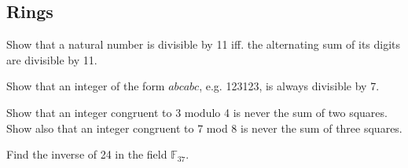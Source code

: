 \subsection{Rings}
\item Show that a natural number is divisible by 11 iff. the alternating sum of its digits are divisible by 11.
\item Show that an integer of the form $abcabc$, e.g. 123123, is always divisible by 7.
\item Show that an integer congruent to 3 modulo 4 is never the sum of two squares. Show also that an integer congruent to 7 mod 8 is never the sum of three squares.
\item Find the inverse of 24 in the field $\mathbb{F}_{37}$.